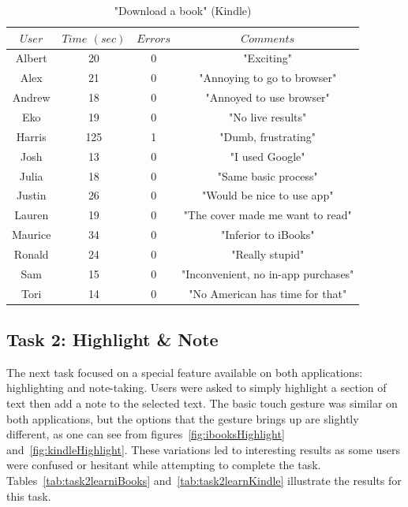\documentclass[journal, a4paper]{IEEEtran}
\begin{document}
    \begin{table}[!hbt]
		\begin{center}
		\caption{"Download a book" (Kindle)}
		\label{tab:task1learnKindle}
		\begin{tabular}{|c|c|c|c|}
			\hline
			$User$ & $Time$ $(sec)$ & $Errors$ & $Comments$\\
			\hline
            Albert & 20 & 0 & "Exciting"\\
			\hline
			Alex & 21 & 0 & "Annoying to go to browser"\\
			\hline
            Andrew & 18 & 0 & "Annoyed to use browser"\\
			\hline
			Eko & 19 & 0 & "No live results"\\
			\hline
            Harris & 125 & 1 & "Dumb, frustrating"\\
			\hline
			Josh & 13 & 0 & "I used Google"\\
			\hline
            Julia & 18 & 0 & "Same basic process"\\
			\hline
            Justin & 26 & 0 & "Would be nice to use app"\\
			\hline
            Lauren & 19 & 0 & "The cover made me want to read"\\
			\hline
            Maurice & 34 & 0 & "Inferior to iBooks"\\
			\hline
            Ronald & 24 & 0 & "Really stupid"\\
			\hline
            Sam & 15 & 0 & "Inconvenient, no in-app purchases"\\
			\hline
            Tori & 14 & 0 & "No American has time for that"\\
			\hline
		\end{tabular}
		\end{center}
	\end{table}
   
\subsection{Task 2: Highlight \& Note}
    The next task focused on a special feature available on both applications: highlighting and note-taking. Users were asked to simply highlight a section of text then add a note to the selected text. The basic touch gesture was similar on both applications, but the options that the gesture brings up are slightly different, as one can see from figures~\ref{fig:ibooksHighlight} and~\ref{fig:kindleHighlight}. These variations led to interesting results as some users were confused or hesitant while attempting to complete the task. Tables~\ref{tab:task2learniBooks} and~\ref{tab:task2learnKindle} illustrate the results for this task.
    
\end{document}
